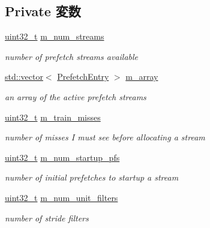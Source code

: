 \subsection*{Private 変数}
\begin{DoxyCompactItemize}
\item 
\hyperlink{Type_8hh_a435d1572bf3f880d55459d9805097f62}{uint32\_\-t} \hyperlink{classPrefetcher_af24cc9f3fcde8ff672f65b91689b1c9c}{m\_\-num\_\-streams}
\begin{DoxyCompactList}\small\item\em number of prefetch streams available \item\end{DoxyCompactList}\item 
\hyperlink{classstd_1_1vector}{std::vector}$<$ \hyperlink{classPrefetchEntry}{PrefetchEntry} $>$ \hyperlink{classPrefetcher_ac70c7174698e1bb57e75d7ee4d31db32}{m\_\-array}
\begin{DoxyCompactList}\small\item\em an array of the active prefetch streams \item\end{DoxyCompactList}\item 
\hyperlink{Type_8hh_a435d1572bf3f880d55459d9805097f62}{uint32\_\-t} \hyperlink{classPrefetcher_ab90010829f9a17cf9fc34b16723e3d75}{m\_\-train\_\-misses}
\begin{DoxyCompactList}\small\item\em number of misses I must see before allocating a stream \item\end{DoxyCompactList}\item 
\hyperlink{Type_8hh_a435d1572bf3f880d55459d9805097f62}{uint32\_\-t} \hyperlink{classPrefetcher_a0a4656906ae582dc063cb6d703f1c3d6}{m\_\-num\_\-startup\_\-pfs}
\begin{DoxyCompactList}\small\item\em number of initial prefetches to startup a stream \item\end{DoxyCompactList}\item 
\hyperlink{Type_8hh_a435d1572bf3f880d55459d9805097f62}{uint32\_\-t} \hyperlink{classPrefetcher_a05a4b7a047922b33e9ce39b879a2ae6b}{m\_\-num\_\-unit\_\-filters}
\begin{DoxyCompactList}\small\item\em number of stride filters \item\end{DoxyCompactList}\item 

\end{DoxyCompactItemize}
